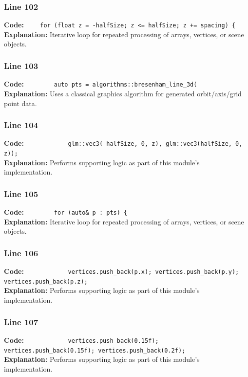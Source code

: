 \documentclass[11pt,a4paper]{article}
\begin{document}
\subsubsection*{Line 102}
\textbf{Code:} \verb|    for (float z = -halfSize; z <= halfSize; z += spacing) {|\\
\textbf{Explanation:} Iterative loop for repeated processing of arrays, vertices, or scene objects.

\subsubsection*{Line 103}
\textbf{Code:} \verb|        auto pts = algorithms::bresenham_line_3d(|\\
\textbf{Explanation:} Uses a classical graphics algorithm for generated orbit/axis/grid point data.

\subsubsection*{Line 104}
\textbf{Code:} \verb|            glm::vec3(-halfSize, 0, z), glm::vec3(halfSize, 0, z));|\\
\textbf{Explanation:} Performs supporting logic as part of this module's implementation.

\subsubsection*{Line 105}
\textbf{Code:} \verb|        for (auto& p : pts) {|\\
\textbf{Explanation:} Iterative loop for repeated processing of arrays, vertices, or scene objects.

\subsubsection*{Line 106}
\textbf{Code:} \verb|            vertices.push_back(p.x); vertices.push_back(p.y); vertices.push_back(p.z);|\\
\textbf{Explanation:} Performs supporting logic as part of this module's implementation.

\subsubsection*{Line 107}
\textbf{Code:} \verb|            vertices.push_back(0.15f); vertices.push_back(0.15f); vertices.push_back(0.2f);|\\
\textbf{Explanation:} Performs supporting logic as part of this module's implementation.
\end{document}
